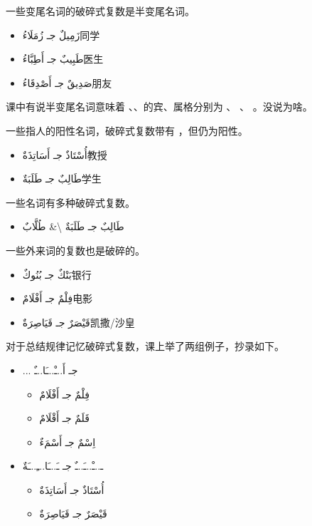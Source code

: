 一些变尾名词的破碎式复数是半变尾名词。

\begin{itemize}
    \item \ac{زَمِيلٌ جـ زُمَلَاءُ}{同学}
    \item \ac{طَبِيبٌ جـ أَطِبَّاءُ}{医生}
    \item \ac{صَدِيقٌ جـ أَصْدِقَاءُ}{朋友}
\end{itemize}

\begin{note}
    课中有说半变尾名词意味着 、、的宾、属格分别为 、 、 。没说为啥。
\end{note}

一些指人的阳性名词，破碎式复数带有 ，但仍为阳性。

\begin{itemize}
    \item \ac{أُسْتَاذٌ جـ أَسَاتِذَةٌ}{教授}
    \item \ac{طَالِبٌ جـ طَلَبَةٌ}{学生}
\end{itemize}

一些名词有多种破碎式复数。

\begin{itemize}
    \item \ac{طَالِبٌ جـ طَلَبَةٌ \& طُلَّابٌ}{}
\end{itemize}

一些外来词的复数也是破碎的。

\begin{itemize}
    \item \ac{بَنْكٌ جـ بُنُوكٌ}{银行}
    \item \ac{فِلْمٌ جـ أَفْلَامٌ}{电影}
    \item \ac{قَيْصَرٌ جـ قَيَاصِرَةٌ}{凯撒/沙皇}
\end{itemize}

\begin{note}
    对于总结规律记忆破碎式复数，课上举了两组例子，抄录如下。
    \begin{Arabic}
        \begin{itemize}
            \item ... جـ أَ..ـْ..ـَا..ـٌ
            \begin{itemize}
                \item فِلْمٌ جـ أَفْلَامٌ
                \item قَلَمٌ جـ أَقْلَامٌ
                \item اِسْمٌ جـ أَسْمَءٌ
            \end{itemize}
            \item ـ..ـْ..ـَ..ـٌ جـ ـَ..ـَا..ـِ..ـَةٌ
            \begin{itemize}
                \item أُسْتَاذٌ جـ أَسَاتِذَةٌ
                \item قَيْصَرٌ جـ قَيَاصِرَةٌ
            \end{itemize}
        \end{itemize}
    \end{Arabic}
\end{note}

